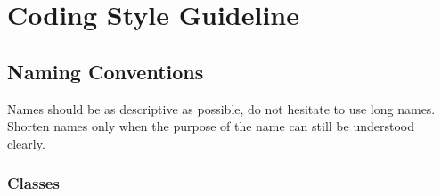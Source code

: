 

\clearpage
\appendix

\section{Coding Style Guideline}


\subsection{Naming Conventions}

Names should be as descriptive as possible, do not hesitate to use
long names.  Shorten names only when the purpose of the name can still
be understood clearly.


\subsubsection{Classes}

